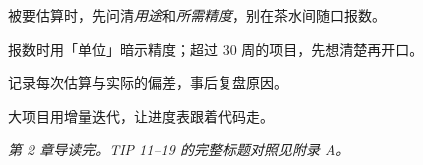 \begin{bitext}
\end{bitext}

\begin{actions}
\item 被要估算时，先问清\emph{用途}和\emph{所需精度}，别在茶水间随口报数。
\item 报数时用「单位」暗示精度；超过 30 周的项目，先想清楚再开口。
\item 记录每次估算与实际的偏差，事后复盘原因。
\item 大项目用增量迭代，让进度表跟着代码走。
\end{actions}

\vspace{0.6em}
\begin{center}
\small\itshape\color{ppgray}
第 2 章导读完。TIP 11--19 的完整标题对照见附录 A。
\end{center}
